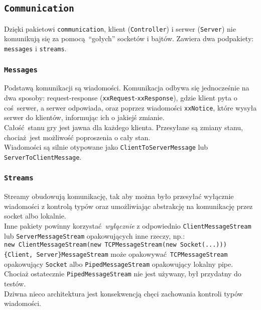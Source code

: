 \documentclass{article}
\newcommand{\ch}[1]{\texttt{#1}}
\begin{document}
\subsection{\ch{Communication}}

Dzięki pakietowi \ch{communication}, klient (\ch{Controller}) i serwer (\ch{Server}) nie komunikują się za pomocą \enquote{gołych} socketów i bajtów. Zawiera dwa podpakiety: \ch{messages} i \ch{streams}.

\subsubsection{\ch{Messages}}

Podstawą komunikacji są wiadomości. Komunikacja odbywa się jednocześnie na dwa sposoby: request-response (\ch{xxRequest}-\ch{xxResponse}), gdzie klient pyta o coś serwer, a serwer odpowiada, oraz poprzez wiadomości \ch{xxNotice}, które wysyła serwer do klientów, informując ich o jakiejś zmianie.\\
Całość stanu gry jest jawna dla każdego klienta. Przesyłane są zmiany stanu, chociaż jest możliwość poproszenia o cały stan.\\

Wiadomości są silnie otypowane jako \ch{ClientToServerMessage} lub \ch{ServerToClientMessage}.

\subsubsection{\ch{Streams}}

Streamy obudowują komunikację, tak aby można było przesyłać wyłącznie wiadomości z kontrolą typów oraz umożliwiając abstrakcję na komunikację przez socket albo lokalnie.\\

Inne pakiety powinny korzystać \textit{wyłącznie} z odpowiednio \ch{ClientMessageStream} lub \ch{ServerMessageStream} opakowujących inne rzeczy, np.:\\
\ch{new ClientMessageStream(new TCPMessageStream(new Socket(...)))}\\

\ch{\{Client, Server\}MessageStream} może opakowywać \ch{TCPMessageStream} opakowujący \ch{Socket} albo \ch{PipedMessageStream} opakowujący lokalny pipe. Chociaż ostatecznie \ch{PipedMessageStream} nie jest używany, był przydatny do testów.\\

Dziwna nieco architektura jest konsekwencją chęci zachowania kontroli typów wiadomości.
\end{document}
